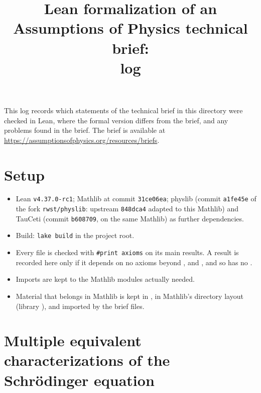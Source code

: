 \documentclass[11pt]{article}
\title{Lean formalization of an Assumptions of Physics technical brief:\\ log}
\author{}
\date{}
\begin{document}
\maketitle

\noindent
This log records which statements of the technical brief in this directory were checked in Lean,
where the formal version differs from the brief, and any problems found in the brief.
The brief is available at \url{https://assumptionsofphysics.org/resources/briefs}.

\section*{Setup}

\begin{itemize}
\item Lean \texttt{v4.37.0-rc1}; Mathlib at commit \texttt{31ce06ea}; physlib (commit \texttt{a1fe45e}
  of the fork \texttt{rwst/physlib}: upstream \texttt{848dca4} adapted to this Mathlib) and
  TauCeti (commit \texttt{b608709}, on the same Mathlib) as further dependencies.
\item Build: \texttt{lake build} in the project root.
\item Every file is checked with \texttt{\#print axioms} on its main results. A result is
  recorded here only if it depends on no axioms beyond ,
   and , and so has no .
\item Imports are kept to the Mathlib modules actually needed.
\item Material that belongs in Mathlib is kept in , in Mathlib's directory
  layout (library ), and imported by the brief files.
\end{itemize}



\section{Multiple equivalent characterizations of the Schr\"odinger equation}
\end{document}
